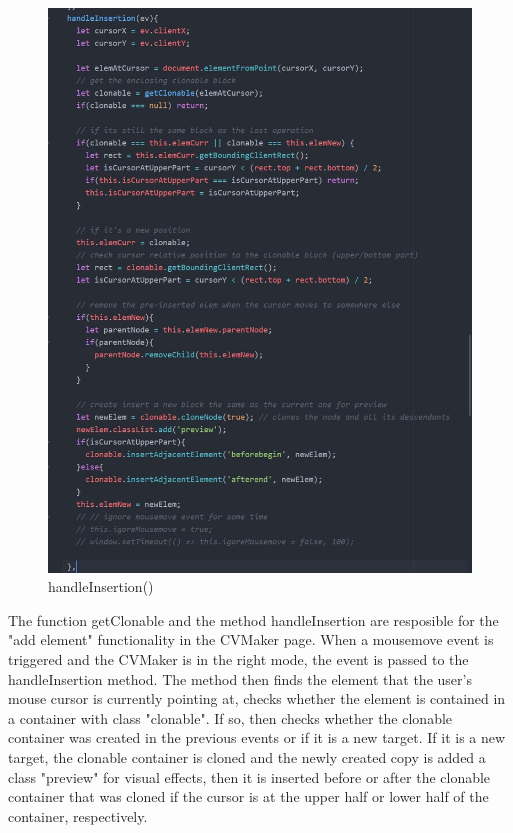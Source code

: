 \documentclass[11pt]{article}
\begin{document}
\begin{spacing}{1.0}
\begin{itemize}
\begin{figure}[H]
	\centering
	\includegraphics[scale=.5]{figures/js/handleInsertion.jpg}
	\caption{handleInsertion()}
\end{figure}
	The function getClonable and the method handleInsertion are resposible for the "add element" functionality in the CVMaker page. When a mousemove event is triggered and the CVMaker is in the right mode, the event is passed to the handleInsertion method. The method then finds the element that the user's mouse cursor is currently pointing at, checks whether the element is contained in a container with class "clonable". If so, then checks whether the clonable container was created in the previous events or if it is a new target. If it is a new target, the clonable container is cloned and the newly created copy is added a class "preview" for visual effects, then it is inserted before or after the clonable container that was cloned if the cursor is at the upper half or lower half of the container, respectively.
	

\end{itemize}
\end{spacing}
\end{document}
